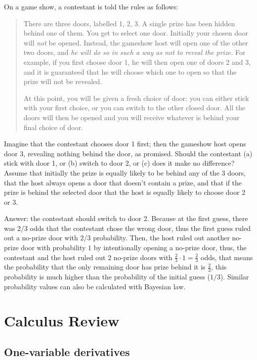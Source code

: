 \documentclass{article}
\def\blu#1{{\color{blu}#1}}
\begin{document}
On a game show, a contestant is told the rules as 
 follows:
\begin{quote}
 There are three doors, labelled 1, 2, 3. A single
 prize has been hidden behind one of 
 them. You get to select one door. Initially your chosen door will {\em not\/} 
 be opened. Instead, the gameshow host will open one of the other two doors, 
 and {\em he will do so in such a way as not to reveal the prize.}
 For example, if you first
 choose door 1, he will then open {one\/} of doors 2 and 3, and it 
 is guaranteed that he will choose which one to open so that
 the prize will not be revealed. 

 At this point, you will be given a fresh choice of door:
 you can either stick with your first choice,
 or you can switch to the other 
 closed door.  All the doors will then be opened and 
 you will  receive whatever is behind your final 
 choice of door.
\end{quote}
  Imagine that the contestant chooses door 1 first; then the gameshow host 
 opens door 3, revealing nothing behind the door, as promised. 
 \blu{Should the contestant (a) stick with door 1, or (b)
 switch to door 2, or (c) does it make no difference?}
Assume that initially the prize is equally likely to be
behind any of the 3 doors, that the host always opens a door that doesn't contain a prize, and that if the prize is behind the selected door that the host is equally likely to choose door 2 or 3.


\blu{Answer:} the contestant should switch to door 2. Because at the first guess, there was $2/3$ odds that the contestant chose the wrong door, thus the first guess ruled out a no-prize door with $2/3$ probability. Then, the host ruled out another no-prize door with probability $1$ by intentionally opening a no-prize door, thus, the contestant and the host ruled out 2 no-prize doors with $\frac{2}{3}\cdot 1=\frac{2}{3}$ odds, that means the probability that the only remaining door has prize behind it is $\frac{2}{3}$, this probability is much higher than the probability of the initial guess ($1/3$). Similar probability values can also be calculated with Bayesian law.


\section{Calculus Review}

\subsection{One-variable derivatives}
\end{document}
